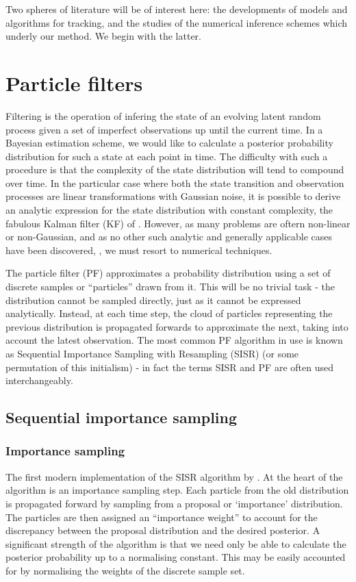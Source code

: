 Two spheres of literature will be of interest here: the developments of models and algorithms for tracking, and the studies of the numerical inference schemes which underly our method. We begin with the latter.

\section{Particle filters}

Filtering is the operation of infering the state of an evolving latent random process given a set of imperfect observations up until the current time. In a Bayesian estimation scheme, we would like to calculate a posterior probability distribution for such a state at each point in time. The difficulty with such a procedure is that the complexity of the state distribution will tend to compound over time. In the particular case where both the state transition and observation processes are linear transformations with Gaussian noise, it is possible to derive an analytic expression for the state distribution with constant complexity, the fabulous Kalman filter (KF) of \cite{Kalman1960}. However, as many problems are oftern non-linear or non-Gaussian, and as no other such analytic and generally applicable cases have been discovered, \cite{Daum2005}, we must resort to numerical techniques.

The particle filter (PF) approximates a probability distribution using a set of discrete samples or ``particles'' drawn from it. This will be no trivial task - the distribution cannot be sampled directly, just as it cannot be expressed analytically. Instead, at each time step, the cloud of particles representing the previous distribution is propagated forwards to approximate the next, taking into account the latest observation. The most common PF algorithm in use is known as Sequential Importance Sampling with Resampling (SISR) (or some permutation of this initialism) - in fact the terms SISR and PF are often used interchangeably.

\subsection{Sequential importance sampling}

\subsubsection{Importance sampling}
The first modern implementation of the SISR algorithm by \cite{Gordon1993}. At the heart of the algorithm is an importance sampling step. Each particle from the old distribution is propagated forward by sampling from a proposal or `importance' distribution. The particles are then assigned an ``importance weight'' to account for the discrepancy between the proposal distribution and the desired posterior. A significant strength of the algorithm is that we need only be able to calculate the posterior probability up to a normalising constant. This may be easily accounted for by normalising the weights of the discrete sample set.

